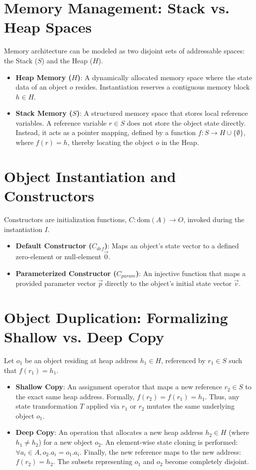 \documentclass[10pt,journal,compsoc]{IEEEtran}
\begin{document}
\section{Memory Management: Stack vs. Heap Spaces}
Memory architecture can be modeled as two disjoint sets of addressable spaces: the Stack ($S$) and the Heap ($H$).
\begin{itemize}
\item \textbf{Heap Memory ($H$)}: A dynamically allocated memory space where the state data of an object $o$ resides. Instantiation reserves a contiguous memory block $h \in H$.
\item \textbf{Stack Memory ($S$)}: A structured memory space that stores local reference variables. A reference variable $r \in S$ does not store the object state directly. Instead, it acts as a pointer mapping, defined by a function $f: S \to H \cup \{\emptyset\}$, where $f(r) = h$, thereby locating the object $o$ in the Heap.
\end{itemize}

\section{Object Instantiation and Constructors}
Constructors are initialization functions, $C: \text{dom}(A) \to O$, invoked during the instantiation $I$.
\begin{itemize}
\item \textbf{Default Constructor ($C_{def}$)}: Maps an object's state vector to a defined zero-element or null-element $\vec{0}$.
\item \textbf{Parameterized Constructor ($C_{param}$)}: An injective function that maps a provided parameter vector $\vec{p}$ directly to the object's initial state vector $\vec{v}$.
\end{itemize}

\section{Object Duplication: Formalizing Shallow vs. Deep Copy}
Let $o_1$ be an object residing at heap address $h_1 \in H$, referenced by $r_1 \in S$ such that $f(r_1) = h_1$.
\begin{itemize}
\item \textbf{Shallow Copy}: An assignment operator that maps a new reference $r_2 \in S$ to the exact same heap address. Formally, $f(r_2) = f(r_1) = h_1$. Thus, any state transformation $T$ applied via $r_1$ or $r_2$ mutates the same underlying object $o_1$.
\item \textbf{Deep Copy}: An operation that allocates a new heap address $h_2 \in H$ (where $h_1 \neq h_2$) for a new object $o_2$. An element-wise state cloning is performed: $\forall a_i \in A, o_2.a_i = o_1.a_i$. Finally, the new reference maps to the new address: $f(r_2) = h_2$. The subsets representing $o_1$ and $o_2$ become completely disjoint.
\end{itemize}
\end{document}
